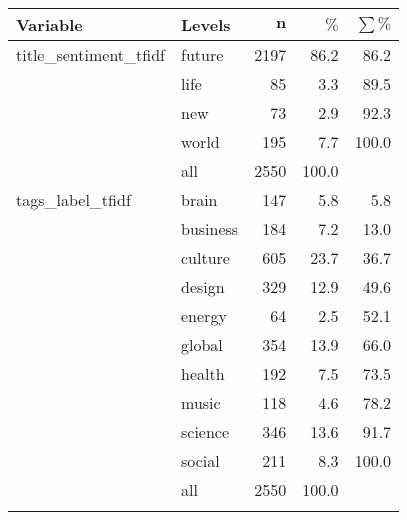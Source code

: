 \begingroup\footnotesize
\begin{longtable}{ll|rrr}
 \textbf{Variable} & \textbf{Levels} & $\mathbf{n}$ & $\mathbf{\%}$ & $\mathbf{\sum \%}$ \\ 
  \hline
title\_sentiment\_tfidf & future & 2197 & 86.2 & 86.2 \\ 
   & life & 85 & 3.3 & 89.5 \\ 
   & new & 73 & 2.9 & 92.3 \\ 
   & world & 195 & 7.7 & 100.0 \\ 
   \hline
 & all & 2550 & 100.0 &  \\ 
   \hline
\hline
tags\_label\_tfidf & brain & 147 & 5.8 & 5.8 \\ 
   & business & 184 & 7.2 & 13.0 \\ 
   & culture & 605 & 23.7 & 36.7 \\ 
   & design & 329 & 12.9 & 49.6 \\ 
   & energy & 64 & 2.5 & 52.1 \\ 
   & global & 354 & 13.9 & 66.0 \\ 
   & health & 192 & 7.5 & 73.5 \\ 
   & music & 118 & 4.6 & 78.2 \\ 
   & science & 346 & 13.6 & 91.7 \\ 
   & social & 211 & 8.3 & 100.0 \\ 
   \hline
 & all & 2550 & 100.0 &  \\ 
   \hline
\hline
\hline
\caption{} 
\label{}
\end{longtable}
\endgroup
